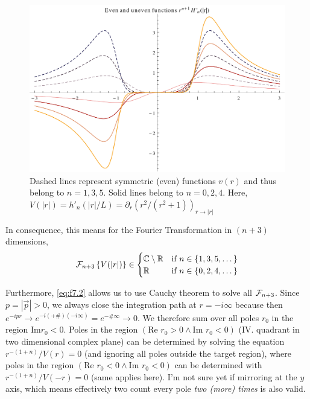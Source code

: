 \documentclass[10pt,a4paper, fleqn]{article}
\begin{document}
\begin{appendices}
\begin{figure}[h]
\center%
\includegraphics[width=13cm]{plots/fourier-even.pdf}
\caption{Dashed lines represent symmetric (even) functions $v(r)$ and thus belong to $n=1,3,5$. Solid lines belong to $n=0,2,4$. Here, $V(|r|)=h'_n(|r|/L) = \partial_r \left(r^2 / (r^2 + 1) \right)_{r\to |r|}$
}\label{fig:fourier-even}
\end{figure}

In consequence, this means for the Fourier Transformation in $(n+3)$ dimensions,
\begin{equation}
{\cal F}_{n+3} \left\{ V(|r|) \right\} \in 
\begin{cases}
\mathbb{C} \setminus \mathbb{R}   &\mbox{if } n \in \{ 1,3,5, \dots \} \\
\mathbb{R}   &\mbox{if } n \in \{0,2,4,\dots \}
\end{cases}
\end{equation}

Furthermore, \eqref{eq:f7.2} allows us to use Cauchy theorem to solve all ${\cal F}_{n+3}$. Since $p=|\vec p|>0$, we always close the integration path at $r=-i\infty$ because then $e^{-ipr}\to e^{-i(+\#)(-i\infty)} = e^{-\# \infty} \to 0$. We therefore sum over all poles $r_0$ in the region $\text{Im} r_0 < 0$. Poles in the region $(\text{Re } r_0 > 0 \land \text{Im } r_0 < 0)$ (IV. quadrant in two dimensional complex plane) can be determined by solving the equation $r^{-(1+n)}/V(r) = 0$ (and ignoring all poles outside the target region), where poles in the region $(\text{Re } r_0 < 0 \land \text{Im } r_0 < 0)$ can be determined with $r^{-(1+n)}/V(-r) = 0$ (same applies here). I'm not sure yet if mirroring at the $y$ axis, which means effectively two count every pole {\it two (more) times} is also valid.


\end{appendices}
\end{document}
